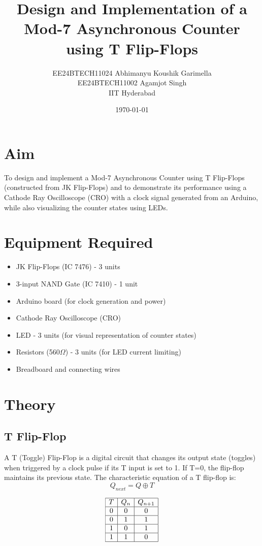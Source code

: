 \documentclass[12pt]{article}
\title{Design and Implementation of a Mod-7 Asynchronous Counter using T Flip-Flops}
\author{EE24BTECH11024 Abhimanyu Koushik Garimella\\EE24BTECH11002 Agamjot Singh\\IIT Hyderabad}
\date{\today}
\begin{document}
\maketitle

\section{Aim}
To design and implement a Mod-7 Asynchronous Counter using T Flip-Flops (constructed from JK Flip-Flops) and to demonstrate its performance using a Cathode Ray Oscilloscope (CRO) with a clock signal generated from an Arduino, while also visualizing the counter states using LEDs.

\section{Equipment Required}
\begin{itemize}
    \item JK Flip-Flops (IC 7476) - 3 units
    \item 3-input NAND Gate (IC 7410) - 1 unit
    \item Arduino board (for clock generation and power)
    \item Cathode Ray Oscilloscope (CRO)
    \item LED - 3 units (for visual representation of counter states)
    \item Resistors (560$\Omega$) - 3 units (for LED current limiting)
    \item Breadboard and connecting wires
\end{itemize}

\section{Theory}

\subsection{T Flip-Flop}
A T (Toggle) Flip-Flop is a digital circuit that changes its output state (toggles) when triggered by a clock pulse if its T input is set to 1. If T=0, the flip-flop maintains its previous state. The characteristic equation of a T flip-flop is:
\begin{equation}
Q_{next} = Q \oplus T
\end{equation}

\begin{align*}
\begin{array}{|c|c|c|}
\hline
T & Q_n & Q_{n+1} \\
\hline
0 & 0 & 0 \\
\hline
0 & 1 & 1 \\
\hline
1 & 0 & 1 \\
\hline
1 & 1 & 0 \\
\hline
\end{array}
\end{align*}
\end{document}
